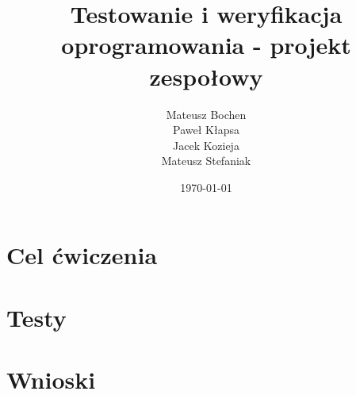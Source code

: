 \documentclass[a4paper,11pt,notitlepage]{article}
\author{Mateusz Bochen\\Paweł Kłapsa\\Jacek Kozieja\\Mateusz Stefaniak}
\title{Testowanie i weryfikacja oprogramowania - projekt zespołowy}
\date{\today}
\begin{document}
\maketitle
\tableofcontents

\section{Cel ćwiczenia}

\section{Testy}

\section{Wnioski}
\end{document}

